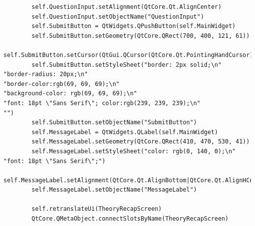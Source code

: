 \documentclass{article}
\begin{document}
\begin{lstlisting}
        self.QuestionInput.setAlignment(QtCore.Qt.AlignCenter)
        self.QuestionInput.setObjectName("QuestionInput")
        self.SubmitButton = QtWidgets.QPushButton(self.MainWidget)
        self.SubmitButton.setGeometry(QtCore.QRect(700, 400, 121, 61))
        self.SubmitButton.setCursor(QtGui.QCursor(QtCore.Qt.PointingHandCursor))
        self.SubmitButton.setStyleSheet("border: 2px solid;\n"
"border-radius: 20px;\n"
"border-color:rgb(69, 69, 69);\n"
"background-color: rgb(69, 69, 69);\n"
"font: 18pt \"Sans Serif\"; color:rgb(239, 239, 239);\n"
"")
        self.SubmitButton.setObjectName("SubmitButton")
        self.MessageLabel = QtWidgets.QLabel(self.MainWidget)
        self.MessageLabel.setGeometry(QtCore.QRect(410, 470, 530, 41))
        self.MessageLabel.setStyleSheet("color: rgb(0, 140, 0);\n"
"font: 18pt \"Sans Serif\";")
        self.MessageLabel.setAlignment(QtCore.Qt.AlignBottom|QtCore.Qt.AlignHCenter)
        self.MessageLabel.setObjectName("MessageLabel")

        self.retranslateUi(TheoryRecapScreen)
        QtCore.QMetaObject.connectSlotsByName(TheoryRecapScreen)


\end{lstlisting}
\end{document}
